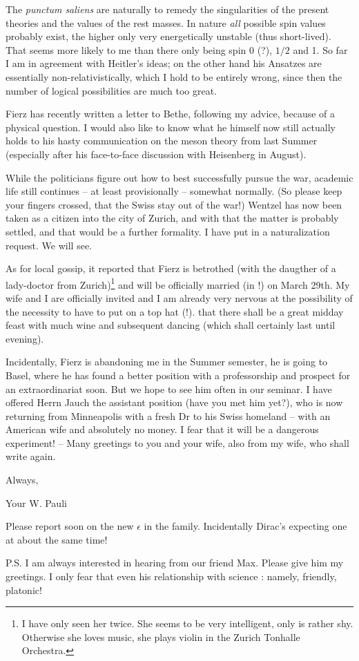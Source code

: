 The \textit{punctum saliens} are naturally to remedy the singularities of the present theories and the values of the rest masses. In nature \textit{all} possible spin values probably exist, the higher only very energetically unstable (thus short-lived). That seems more likely to me than there only being spin 0 (?), $1/2$ and 1. So far I am in agreement with Heitler's ideas; on the other hand his Ansatzes are essentially non-relativistically, which I hold to be entirely wrong, since then the number of logical possibilities are much too great.

Fierz has recently written a letter to Bethe, following my advice, because of a physical question. I would also like to know what he himself now still actually holds to his hasty communication on the meson theory from last Summer (especially after his face-to-face discussion with Heisenberg in August).

While the politicians figure out how to best successfully pursue the war, academic life still continues -- at least provisionally -- somewhat normally. (So please keep your fingers crossed, that the Swiss stay out of the war!) Wentzel has now been taken as a citizen into the city of Zurich, and with that the matter is probably settled, and that would be a further formality. I have put in a naturalization request. We will see.

As for local gossip, it reported that Fierz is betrothed (with the daugther of a lady-doctor from Zurich)\footnote{I have only seen her twice. She seems to be very intelligent, only is rather shy. Otherwise she loves music, she plays violin in the Zurich Tonhalle Orchestra.} and will be officially married (in !) on March 29th. My wife and I are officially invited and I am already very nervous at the possibility of the necessity to have to put on a top hat (!).  that there shall be a great midday feast with much wine and subsequent dancing (which shall certainly last until evening).

Incidentally, Fierz is abandoning me in the Summer semester, he is going to Basel, where he has found a better position with a professorship and prospect for an extraordinariat soon. But we hope to see him often in our seminar. I have offered Herrn Jauch the assistant position (have you met him yet?), who is now returning from Minneapolis with a fresh Dr to his Swiss homeland -- with an American wife and absolutely no money. I fear that it will be a dangerous experiment! -- Many greetings to you and your wife, also from my wife, who shall write again.

Always,

Your W. Pauli

Please report soon on the new $\epsilon$ in the family. Incidentally Dirac's expecting one at about the same time!

P.S. I am always interested in hearing from our friend Max. Please give him my greetings. I only fear that even his relationship with science : namely, friendly, platonic!

